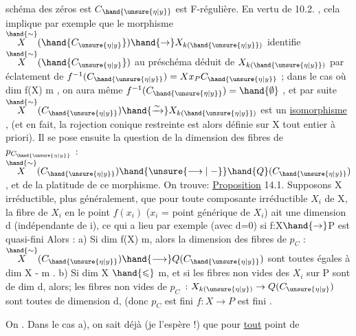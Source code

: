 schéma des zéros est $C$$_{\hand{\unsure{\eta|y}}}$ \unsure{;|,} est F-régulière. En vertu de 10.2. , cela
implique par exemple que le morphisme  $\overset{\hand{\sim}}{X}(\hand{C_{\unsure{\eta|y}}})\hand{\to} X_{k(\hand{\unsure{\eta|y}})}$ identifie $\overset{\hand{\sim}}{X}(\hand{C_{\unsure{\eta|y}}})$ au préschéma
déduit de $X_{k(\hand{\unsure{\eta|y}})}$ par éclatement de $f^{-1}(C_{\hand{\unsure{\eta|y}}})= Xx_P C_{\hand{\unsure{\eta|y}}}$ ;   dans le cas
où  dim f(X) \hand{$\leqslant$} m ,  on  aura même  $f^{-1}(C_{\hand{\unsure{\eta|y}}}) = \hand{\emptyset}$ , et  par suite
$\overset{\hand{\sim}}{X}(C_{\hand{\unsure{\eta|y}}}) \hand{\xrightarrow{\sim}} X_{k(\hand{\unsure{\eta|y}})}$  est un \uline{isomorphisme} , (et en fait, la rojection conique
restreinte  est alors définie sur X tout entier à priori). Il se pose
ensuite la question de la dimension des fibres de $p_{C_{\hand{\unsure{\eta|y}}}}$ : $\overset{\hand{\sim}}{X}(C_{\hand{\unsure{\eta|y}}}) \hand{\unsure{\longrightarrow|\relbar}} \hand{Q}(C_{\hand{\unsure{\eta|y}}})$,
et de la platitude de ce morphisme. On trouve:
\uline{Proposition} 14.1.   Supposons X irréductible,  plus
généralement, que  pour toute composante irréductible $X_i$ de X, la fibre
de $X_i$ en le point $f(x_i)$  ($x_i$ = point générique de $X_i$) ait une dimension d
(indépendante de i), ce qui a lieu par exemple (avec d=0) si f:X$\hand{\to}$P est quasi-fini\hand{,} \placedmargin{}
Alors :     a)  Si  dim f(X) \hand{$>$} m, alors la dimension  des fibres de
$p_C$  : $\overset{\hand{\sim}}{X}(C_{\hand{\unsure{\eta|y}}}) \hand{\longrightarrow} Q(C_{\hand{\unsure{\eta|y}}})$  sont toutes égales à  dim X - m .   b)  Si dim X
$\hand{\leqslant}$ m, et si les fibres non vides des $X_i$ sur P sont  de dim d, alors; les fibres non vides de $p_C$ $\colon X_{k(\unsure{\eta|y})}\to Q(C_{\unsure{\eta|y}})$ sont toutes de dimension d,  (donc $p_C$ est fini   $f\colon X\to P$ est fini \hand{]}.

On 
. Dans le cas a), 
 on sait déjà (je l'espère !) que pour \uline{tout}  point  de


